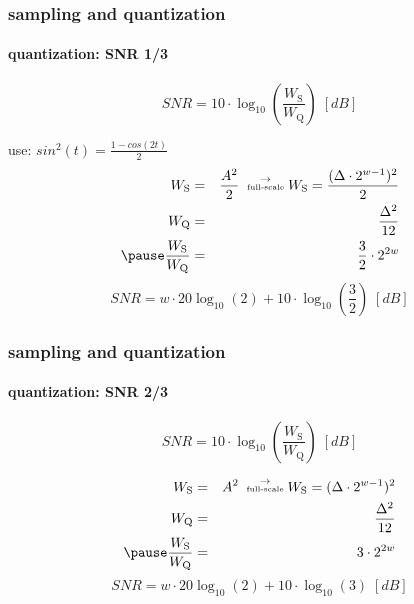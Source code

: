 	\begin{frame}\frametitle{sampling and quantization}\framesubtitle{quantization: SNR 1/3}
        \begin{footnotesize}
			\begin{equation*}\nonumber
				SNR = 10\cdot\log_{10}\left(\frac{W_{\mathrm{S}}}{W_{\mathrm{Q}}}\right)\; [dB] 
			\end{equation*}
			
			\hspace{3mm}use: $sin^2(t) = \frac{1-cos(2t)}{2}$
			\pause
		\begin{eqnarray*}
			W_\mathrm{S} &=& \frac{A^2}{2}\; \stackrel{\rightarrow}{\text{\tiny{full-scale}}} W_\mathrm{S} =\frac{(\Delta\cdot 2^{w-1})^2}{2}\\
			W_\mathrm{Q} &=& \frac{\Delta^2}{12}\\
			\pause
			\frac{W_\mathrm{S}}{W_\mathrm{Q}} &=& \frac{3}{2}\cdot 2^{2w}
		\end{eqnarray*}
        \pause
			\begin{equation*}\nonumber
				SNR = w\cdot 20\log_{10}\left(2\right) + 10\cdot\log_{10}\left(\frac{3}{2}\right)\; [dB] 
			\end{equation*}
        \end{footnotesize}
    \end{frame}		
	\begin{frame}\frametitle{sampling and quantization}\framesubtitle{quantization: SNR 2/3}
        \begin{footnotesize}
			\begin{equation*}\nonumber
				SNR = 10\cdot\log_{10}\left(\frac{W_{\mathrm{S}}}{W_{\mathrm{Q}}}\right)\; [dB] 
			\end{equation*}
			
		\begin{eqnarray*}
			W_\mathrm{S} &=& {A^2}\; \stackrel{\rightarrow}{\text{\tiny{full-scale}}} W_\mathrm{S} ={(\Delta\cdot 2^{w-1})^2}\\
			W_\mathrm{Q} &=& \frac{\Delta^2}{12}\\
			\pause
			\frac{W_\mathrm{S}}{W_\mathrm{Q}} &=& {3}\cdot 2^{2w}
		\end{eqnarray*}
        \pause
			\begin{equation*}\nonumber
				SNR = w\cdot 20\log_{10}\left(2\right) + 10\cdot\log_{10}\left(3\right)\; [dB] 
			\end{equation*}
        \end{footnotesize}
	\end{frame}		
